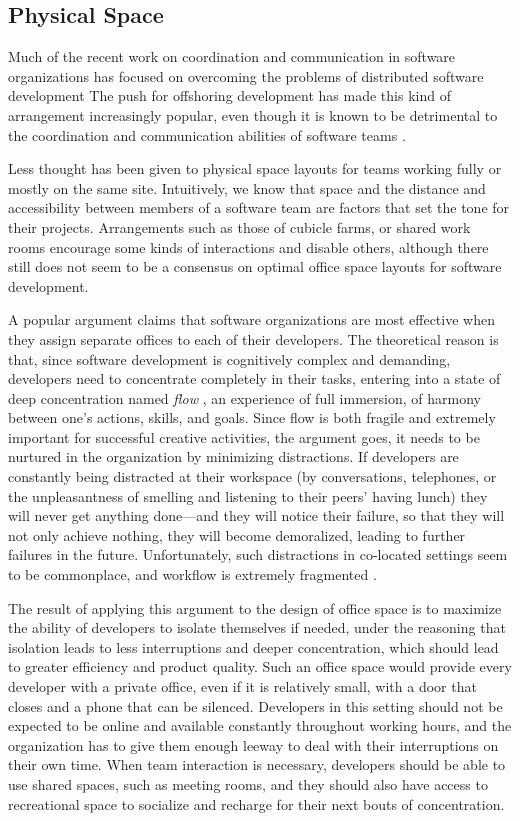 \subsection{Physical Space}

Much of the recent work on coordination and communication in software organizations has focused on overcoming the problems of distributed software development The push for offshoring development has made this kind of arrangement increasingly popular, even though it is known to be detrimental to the coordination and communication abilities of software teams \cite{Herbsleb1999}.

Less thought has been given to physical space layouts for teams working fully or mostly on the same site. Intuitively, we know that space and the distance and accessibility between members of a software team are factors that set the tone for their projects. Arrangements such as those of cubicle farms, or shared work rooms  encourage some kinds of interactions and disable others, although there still does not seem to be a consensus on optimal office space layouts for software development.

A popular argument claims that software organizations are most effective when they assign separate offices to each of their developers. The theoretical reason is that, since software development is cognitively complex and demanding, developers need to concentrate completely in their tasks, entering into a state of deep concentration named \emph{flow} \cite{Csikszentmihalyi1990}, an experience of full immersion, of harmony between one's actions, skills, and goals.  Since flow is both fragile and extremely important for successful creative activities, the argument goes, it needs to be nurtured in the organization by minimizing distractions. If developers are constantly being distracted at their workspace (by conversations, telephones, or the unpleasantness of smelling and listening to their peers' having lunch) they will never get anything done---and they will notice their failure, so that they will not only achieve nothing, they will become demoralized, leading to further failures in the future. Unfortunately, such distractions in co-located settings seem to be commonplace, and workflow is extremely fragmented \cite{Ko2007}.

The result of applying this argument to the design of office space is to maximize the ability of developers to isolate themselves if needed, under the reasoning that isolation leads to less interruptions and deeper concentration, which should lead to greater efficiency and product quality. Such an office space would provide every developer with a private office, even if it is relatively small, with a door that closes and a phone that can be silenced. Developers in this setting should not be expected to be online and available constantly throughout working hours, and the organization has to give them enough leeway to deal with their interruptions on their own time. When team interaction is necessary, developers should be able to use shared spaces, such as meeting rooms, and they should also have access to recreational space to socialize and recharge for their next bouts of concentration.

